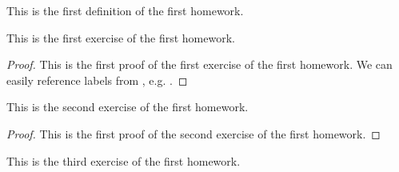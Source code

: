 \begin{definition}
    This is the first definition of the first homework.
\end{definition}
\begin{exercise}\label{ex:H.1.1}
    This is the first exercise of the first homework.
\end{exercise}
\begin{proof}
    This is the first proof of the first exercise of the first homework. We can easily reference labels from , e.g. .
\end{proof}

\begin{exercise}\label{ex:H.1.2}
    This is the second exercise of the first homework.
\end{exercise}

\begin{proof}
    This is the first proof of the second exercise of the first homework.
\end{proof}

\begin{exercise}\label{ex:H.1.3}
    This is the third exercise of the first homework.
\end{exercise}